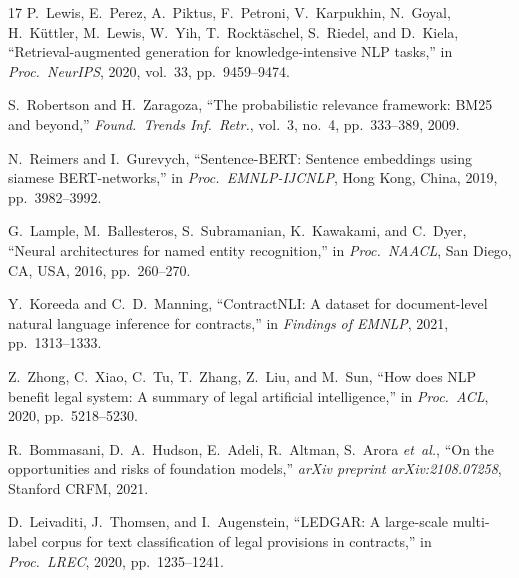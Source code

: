 \documentclass[conference]{IEEEtran}
\begin{document}
\begin{thebibliography}{17}
P.~Lewis, E.~Perez, A.~Piktus, F.~Petroni, V.~Karpukhin, N.~Goyal,
H.~K{\"u}ttler, M.~Lewis, W.~Yih, T.~Rockt{\"a}schel, S.~Riedel, and
D.~Kiela,
``Retrieval-augmented generation for knowledge-intensive NLP tasks,''
in \textit{Proc.\ NeurIPS}, 2020, vol.~33, pp.~9459--9474.

S.~Robertson and H.~Zaragoza,
``The probabilistic relevance framework: BM25 and beyond,''
\textit{Found.\ Trends Inf.\ Retr.}, vol.~3, no.~4, pp.~333--389, 2009.

N.~Reimers and I.~Gurevych,
``Sentence-BERT: Sentence embeddings using siamese BERT-networks,''
in \textit{Proc.\ EMNLP-IJCNLP}, Hong Kong, China, 2019, pp.~3982--3992.

G.~Lample, M.~Ballesteros, S.~Subramanian, K.~Kawakami, and C.~Dyer,
``Neural architectures for named entity recognition,''
in \textit{Proc.\ NAACL}, San Diego, CA, USA, 2016, pp.~260--270.

Y.~Koreeda and C.~D.~Manning,
``ContractNLI: A dataset for document-level natural language inference for
contracts,''
in \textit{Findings of EMNLP}, 2021, pp.~1313--1333.

Z.~Zhong, C.~Xiao, C.~Tu, T.~Zhang, Z.~Liu, and M.~Sun,
``How does NLP benefit legal system: A summary of legal artificial
intelligence,''
in \textit{Proc.\ ACL}, 2020, pp.~5218--5230.

R.~Bommasani, D.~A.~Hudson, E.~Adeli, R.~Altman, S.~Arora \textit{et~al.},
``On the opportunities and risks of foundation models,''
\textit{arXiv preprint arXiv:2108.07258}, Stanford CRFM, 2021.

D.~Leivaditi, J.~Thomsen, and I.~Augenstein,
``LEDGAR: A large-scale multi-label corpus for text classification of legal provisions in contracts,''
in \textit{Proc.\ LREC}, 2020, pp.~1235--1241.

\end{thebibliography}
\end{document}
